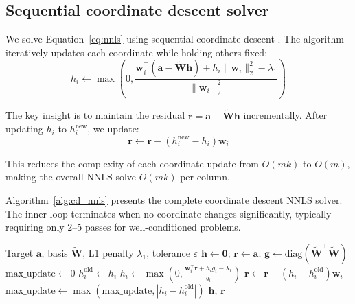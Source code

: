 \documentclass[11pt]{article}
\begin{document}
\subsection{Sequential coordinate descent solver}

We solve Equation~\ref{eq:nnls} using sequential coordinate descent 
\citep{Franc2005}. The algorithm iteratively updates each coordinate while 
holding others fixed:
\begin{equation}
  h_i \leftarrow \max\left(0, \frac{\mathbf{w}_i^\top(\mathbf{a} - 
  \tilde{\mathbf{W}}\mathbf{h}) + h_i \|\mathbf{w}_i\|_2^2 - \lambda_1}
  {\|\mathbf{w}_i\|_2^2}\right)
  \label{eq:cd_update}
\end{equation}

The key insight is to maintain the residual $\mathbf{r} = \mathbf{a} - 
\tilde{\mathbf{W}}\mathbf{h}$ incrementally. After updating $h_i$ to 
$h_i^{\text{new}}$, we update:
\begin{equation}
  \mathbf{r} \leftarrow \mathbf{r} - (h_i^{\text{new}} - h_i)\mathbf{w}_i
  \label{eq:residual_update}
\end{equation}

This reduces the complexity of each coordinate update from $O(mk)$ to $O(m)$, 
making the overall NNLS solve $O(mk)$ per column.

Algorithm~\ref{alg:cd_nnls} presents the complete coordinate descent NNLS 
solver. The inner loop terminates when no coordinate changes significantly, 
typically requiring only 2--5 passes for well-conditioned problems.

\begin{algorithm}[t]
\caption{Coordinate descent NNLS with L1 regularization}
\label{alg:cd_nnls}
\begin{algorithmic}[1]
\Require Target $\mathbf{a}$, basis $\tilde{\mathbf{W}}$, L1 penalty $\lambda_1$, 
tolerance $\varepsilon$
\State $\mathbf{h} \leftarrow \mathbf{0}$; $\mathbf{r} \leftarrow \mathbf{a}$; 
$\mathbf{g} \leftarrow \text{diag}(\tilde{\mathbf{W}}^\top\tilde{\mathbf{W}})$
\Repeat
  \State $\text{max\_update} \leftarrow 0$
    \State $h_i^{\text{old}} \leftarrow h_i$
    \State $h_i \leftarrow \max\left(0, \frac{\mathbf{w}_i^\top\mathbf{r} + 
    h_i g_i - \lambda_1}{g_i}\right)$
      \State $\mathbf{r} \leftarrow \mathbf{r} - (h_i - h_i^{\text{old}})
      \mathbf{w}_i$
      \State $\text{max\_update} \leftarrow \max(\text{max\_update}, 
      |h_i - h_i^{\text{old}}|)$
    \EndIf
  \EndFor
{}
\State \Return $\mathbf{h}$, $\mathbf{r}$
\end{algorithmic}
\end{algorithm}
\end{document}

